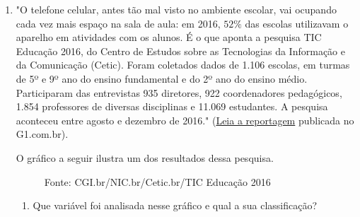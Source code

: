{\begin{enumerate}
\begin{enumerate}
\item {} 
Existe uma variável qualitativa de interesse nessa pesquisa; qual poderia ter sido a questão formulada na pesquisa para obter as informações dessa variável? Justifique a sua resposta.

\item {} 
Existe uma variável quantitativa de interesse nessa pesquisa; qual poderia ter sido a questão formulada na pesquisa para obter as informações dessa variável? Justifique a sua resposta.

\end{enumerate}

\item "O telefone celular, antes tão mal visto no ambiente escolar, vai ocupando cada vez mais espaço na sala de aula: em 2016, $52\%$ das escolas utilizavam o aparelho em atividades com os alunos. É o que aponta a pesquisa TIC Educação 2016, do Centro de Estudos sobre as Tecnologias da Informação e da Comunicação (Cetic).
Foram coletados dados de 1.106 escolas, em turmas de 5º e 9º ano do ensino fundamental e do 2º ano do ensino médio. Participaram das entrevistas 935 diretores, 922 coordenadores pedagógicos, 1.854 professores de diversas disciplinas e 11.069 estudantes. A pesquisa aconteceu entre agosto e dezembro de 2016." (\href{https://g1.globo.com/educacao/notici/52-das-instituicoes-de-educacao-basica-usam-celular-em-atividades-escolares-aponta-estudo-da-cetic.gtml}{Leia a reportagem} publicada no G1.com.br).

O gráfico a seguir ilustra um dos resultados dessa pesquisa.

\begin{figure}[H]
\centering
\capstart

\caption{Fonte: CGI.br/NIC.br/Cetic.br/TIC Educação 2016}\label{\detokenize{PE103-E:fig-internet-tic}}\label{\detokenize{PE103-E:id16}}\end{figure}
\begin{enumerate}
\item {} 
Que variável foi analisada nesse gráfico e qual a sua classificação?


\end{enumerate}
\end{enumerate}}
